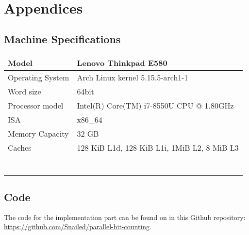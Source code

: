 \section{Appendices}
\begin{appendices}
\setcounter{secnumdepth}{2}
\renewcommand\thesubsection{\Alph{subsection}}
\subsection{Machine Specifications}
\label{appendix:machine-specs}
\begin{table}[H]
\begin{tabular}{ll}
\hline
\multicolumn{1}{|l|}{Model}            & \multicolumn{1}{l|}{Lenovo Thinkpad E580}                        \\ \hline
\multicolumn{1}{|l|}{Operating System} & \multicolumn{1}{l|}{Arch Linux kernel 5.15.5-arch1-1}            \\ \hline
\multicolumn{1}{|l|}{Word size}        & \multicolumn{1}{l|}{64bit}                                       \\ \hline
\multicolumn{1}{|l|}{Processor model}  & \multicolumn{1}{l|}{Intel(R) Core(TM) i7-8550U CPU @ 1.80GHz}    \\ \hline
\multicolumn{1}{|l|}{ISA}              & \multicolumn{1}{l|}{x86\_64}                                     \\ \hline
\multicolumn{1}{|l|}{Memory Capacity}              & \multicolumn{1}{l|}{32 GB}                                     \\ \hline
\multicolumn{1}{|l|}{Caches}           & \multicolumn{1}{l|}{128 KiB L1d, 128 KiB L1i, 1MiB L2, 8 MiB L3} \\ \hline
                                       &                                                                  \\
                                       &                                                                  \\
                                       &                                                                  \\
                                       &                                                                  \\
                                       &                                                                  \\
                                       &                                                                  \\
                                       &                                                                 
\end{tabular}
\end{table}

\subsection{Code}
\label{appendix:code}
The code for the implementation part can be found on in this Github repository: \url{https://github.com/Snailed/parallel-bit-counting}.
\end{appendices}
